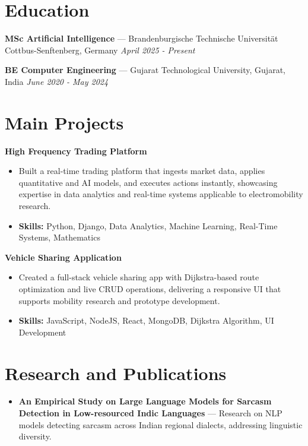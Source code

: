 \documentclass[a4paper,10pt]{article}
\begin{document}
\section*{Education}
\textbf{MSc Artificial Intelligence} — Brandenburgische Technische Universität Cottbus-Senftenberg, Germany \hfill \textit{April 2025 - Present}\par
\vspace{1.5pt}
\textbf{BE Computer Engineering} — Gujarat Technological University, Gujarat, India \hfill \textit{June 2020 - May 2024}\par

\section*{Main Projects}
\textbf{High Frequency Trading Platform}\par
\vspace{1pt}
\begin{itemize}
  \item Built a real-time trading platform that ingests market data, applies quantitative and AI models, and executes actions instantly, showcasing expertise in data analytics and real-time systems applicable to electromobility research.
  \item \textbf{Skills:} Python, Django, Data Analytics, Machine Learning, Real-Time Systems, Mathematics
\end{itemize}
\vspace{3pt}
\textbf{Vehicle Sharing Application}\par
\vspace{1pt}
\begin{itemize}
  \item Created a full-stack vehicle sharing app with Dijkstra-based route optimization and live CRUD operations, delivering a responsive UI that supports mobility research and prototype development.
  \item \textbf{Skills:} JavaScript, NodeJS, React, MongoDB, Dijkstra Algorithm, UI Development
\end{itemize}

\section*{Research and Publications}
\begin{itemize}
\item \textbf{An Empirical Study on Large Language Models for Sarcasm Detection in Low-resourced Indic Languages} — Research on NLP models detecting sarcasm across Indian regional dialects, addressing linguistic diversity.
\end{itemize}
\end{document}
